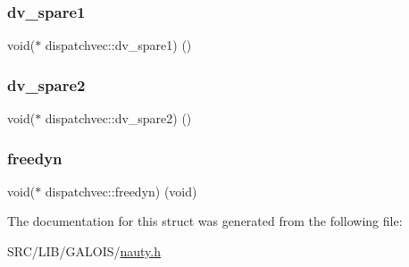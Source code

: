 \subsubsection{\texorpdfstring{dv\+\_\+spare1}{dv\_spare1}}
{\footnotesize\ttfamily void($\ast$ dispatchvec\+::dv\+\_\+spare1) ()}

\mbox{\label{structdispatchvec_af71dcfcbcdfecb8026359a028ba3e49a}} 
\subsubsection{\texorpdfstring{dv\+\_\+spare2}{dv\_spare2}}
{\footnotesize\ttfamily void($\ast$ dispatchvec\+::dv\+\_\+spare2) ()}

\mbox{\label{structdispatchvec_a502d86b75d2ac79d874be8082e7573a8}} 
\subsubsection{\texorpdfstring{freedyn}{freedyn}}
{\footnotesize\ttfamily void($\ast$ dispatchvec\+::freedyn) (void)}



The documentation for this struct was generated from the following file\+:\begin{DoxyCompactItemize}
\item 
S\+R\+C/\+L\+I\+B/\+G\+A\+L\+O\+I\+S/\mbox{\hyperlink{nauty_8h}{nauty.\+h}}\end{DoxyCompactItemize}
